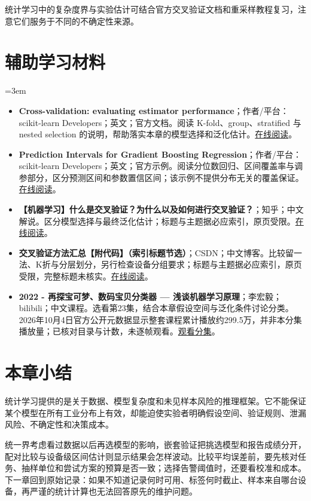 统计学习中的复杂度界与实验估计可结合官方交叉验证文档和重采样教程复习，注意它们服务于不同的不确定性来源。
\section*{辅助学习材料}
\begingroup
\emergencystretch=3em
\begin{itemize}
\item \textbf{Cross-validation: evaluating estimator performance}；作者/平台：scikit-learn Developers；英文；官方文档。阅读 K-fold、group、stratified 与 nested selection 的说明，帮助落实本章的模型选择和泛化估计。\href{https://scikit-learn.org/stable/modules/cross\_validation.html}{在线阅读}。
\item \textbf{Prediction Intervals for Gradient Boosting Regression}；作者/平台：scikit-learn Developers；英文；官方示例。阅读分位数回归、区间覆盖率与调参部分，区分预测区间和参数置信区间；该示例不提供分布无关的覆盖保证。\href{https://scikit-learn.org/stable/auto\_examples/ensemble/plot\_gradient\_boosting\_quantile.html}{在线阅读}。
\item \textbf{【机器学习】什么是交叉验证？为什么以及如何进行交叉验证？}；知乎；中文解说。区分模型选择与最终泛化估计；标题与主题据必应索引，原页受限。\href{https://zhuanlan.zhihu.com/p/81738187251}{在线阅读}。
\item \textbf{交叉验证方法汇总【附代码】（索引标题节选）}；CSDN；中文博客。比较留一法、K折与分层划分，另行检查设备分组要求；标题与主题据必应索引，原页受限，完整标题未核实。\href{https://blog.csdn.net/WHYbeHERE/article/details/108192957}{在线阅读}。
\item \textbf{2022 - 再探宝可梦、数码宝贝分类器 — 浅谈机器学习原理}；李宏毅；bilibili；中文课程。选看第23集，结合本章假设空间与泛化条件讨论分类。2026年10月4日官方公开元数据显示整套课程累计播放约299.5万，并非本分集播放量；已核对目录与计数，未逐帧观看。\href{https://www.bilibili.com/video/BV1Wv411h7kN/?p=23}{观看分集}。
\end{itemize}
\endgroup
\section{本章小结}
统计学习提供的是关于数据、模型复杂度和未见样本风险的推理框架。它不能保证某个模型在所有工业分布上有效，却能迫使实验者明确假设空间、验证规则、泄漏风险、不确定性和决策成本。

统一界考虑看过数据以后再选模型的影响，嵌套验证把挑选模型和报告成绩分开，配对比较与设备级区间估计则显示结果会怎样波动。比较平均误差前，要先核对任务、抽样单位和尝试方案的预算是否一致；选择告警阈值时，还要看校准和成本。下一章回到原始记录：如果不知道记录何时可用、标签何时截止、样本来自哪台设备，再严谨的统计计算也无法回答原先的维护问题。
